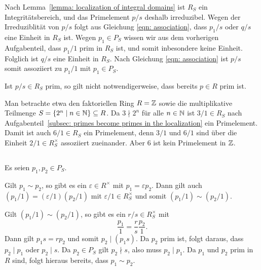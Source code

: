 \documentclass[a4paper,10pt,numbers=noenddot]{scrartcl}
\begin{document}
Nach Lemma~\ref{lemma: localization of integral domains} ist $R_S$ ein Integritätsbereich, und das Primelement $p/s$ deshalb irreduzibel.
Wegen der Irreduziblität von $p/s$ folgt aus Gleichung \eqref{eqn: association}, dass $p_1/s$ oder $q/s$ eine Einheit in $R_S$ ist.
Wegen $p_1 \in P_S$ wissen wir aus dem vorherigen Aufgabenteil, dass $p_1/1$ prim in $R_S$ ist, und somit inbesondere keine Einheit.
Folglich ist $q/s$ eine Einheit in $R_S$.
Nach Gleichung \eqref{eqn: association} ist $p/s$ somit assoziiert zu $p_1/1$ mit $p_1 \in P_S$.

\begin{warning}
  Ist $p/s \in R_S$ prim, so gilt nicht notwendigerweise, dass bereits $p \in R$ prim ist.
  
  Man betrachte etwa den faktoriellen Ring $R = \mathbb{Z}$ sowie die multiplikative Teilmenge $S = \{2^n \mid n \in \mathbb{N}\} \subseteq R$.
  Da $3 \nmid 2^n$ für alle $n \in \mathbb{N}$ ist $3/1 \in R_S$ nach Aufgabenteil~\ref{subsec: primes become primes in the localization} ein Primelement.
  Damit ist auch $6/1 \in R_S$ ein Primelement, denn $3/1$ und $6/1$ sind über die Einheit $2/1 \in R_S^{\times}$ assoziiert zueinander.
  Aber $6$ ist kein Primelement in $\mathbb{Z}$.
\end{warning}






\subsection{}

Es seien $p_1, p_2 \in P_S$.

Gilt $p_1 \sim p_2$, so gibt es ein $\varepsilon \in R^\times$ mit $p_1 = \varepsilon p_2$.
Dann gilt auch $(p_1/1) = (\varepsilon/1)(p_2/1)$ mit $\varepsilon/1 \in R_S^\times$ und somit $(p_1/1) \sim (p_2/1)$.

Gilt $(p_1/1) \sim (p_2/1)$, so gibt es ein $r/s \in R_S^\times$ mit
\[
    \frac{p_1}{1}
  = \frac{r}{s} \frac{p_2}{1}.
\]
Dann gilt $p_1 s = r p_2$ und somit $p_2 \mid (p_1 s)$.
Da $p_2$ prim ist, folgt daraus, dass $p_2 \mid p_1$ oder $p_2 \mid s$.
Da $p_2 \in P_S$ gilt $p_2 \nmid s$, also muss $p_2 \mid p_1$.
Da $p_1$ und $p_2$ prim in $R$ sind, folgt hieraus bereits, dass $p_1 \sim p_2$.
\end{document}
